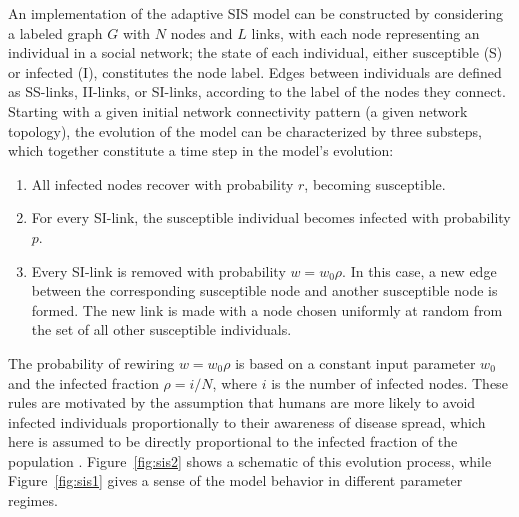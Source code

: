 An implementation of the adaptive SIS model can be constructed by
considering a labeled graph $G$ with $N$ nodes and $L$ links, with
each node representing an individual in a social network; the state of
each individual, either susceptible (S) or infected (I), constitutes
the node label. Edges between individuals are defined as SS-links,
II-links, or SI-links, according to the label of the nodes they
connect. Starting with a given initial network connectivity pattern (a
given network topology), the evolution of the model can be
characterized by three substeps, which together constitute a time step
in the model's evolution:

\begin{enumerate}
  \item All infected nodes recover with
    probability $r$, becoming susceptible.
  \item For every SI-link, the
    susceptible individual becomes infected with probability $p$.
  \item Every SI-link is removed with probability $w = w_0 \rho$. In this case, a
    new edge between the corresponding susceptible node and another
    susceptible node is formed. The new link is made with a node
    chosen uniformly at random from the set of all other susceptible
    individuals.
\end{enumerate}

The probability of rewiring $w = w_0 \rho$ is based on a constant
input parameter $w_0$ and the infected fraction $\rho = i/N$, where
$i$ is the number of infected nodes. These rules are motivated by the
assumption that humans are more likely to avoid infected individuals
proportionally to their awareness of disease spread, which here is
assumed to be directly proportional to the infected fraction of the
population \cite{gross_epidemic_2006}. Figure~\ref{fig:sis2} shows a
schematic of this evolution process, while Figure~\ref{fig:sis1} gives
a sense of the model behavior in different parameter regimes.

